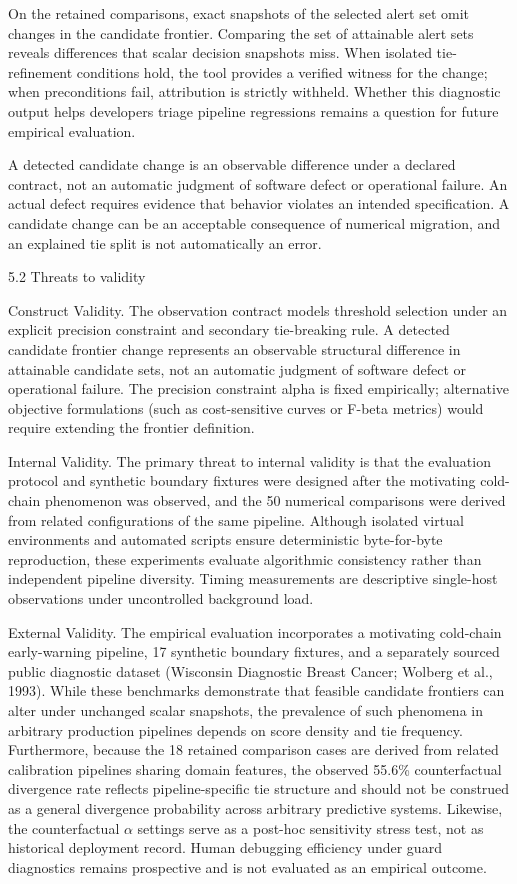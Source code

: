 \documentclass[11pt,a4paper]{article}
\begin{document}
On the retained comparisons, exact snapshots of the selected alert set omit changes in the candidate frontier. Comparing the set of attainable alert sets reveals differences that scalar decision snapshots miss. When isolated tie-refinement conditions hold, the tool provides a verified witness for the change; when preconditions fail, attribution is strictly withheld. Whether this diagnostic output helps developers triage pipeline regressions remains a question for future empirical evaluation.

A detected candidate change is an observable difference under a declared contract, not an automatic judgment of software defect or operational failure. An actual defect requires evidence that behavior violates an intended specification. A candidate change can be an acceptable consequence of numerical migration, and an explained tie split is not automatically an error.

5.2 Threats to validity

Construct Validity. The observation contract models threshold selection under an explicit precision constraint and secondary tie-breaking rule. A detected candidate frontier change represents an observable structural difference in attainable candidate sets, not an automatic judgment of software defect or operational failure. The precision constraint alpha is fixed empirically; alternative objective formulations (such as cost-sensitive curves or F-beta metrics) would require extending the frontier definition.

Internal Validity. The primary threat to internal validity is that the evaluation protocol and synthetic boundary fixtures were designed after the motivating cold-chain phenomenon was observed, and the 50 numerical comparisons were derived from related configurations of the same pipeline. Although isolated virtual environments and automated scripts ensure deterministic byte-for-byte reproduction, these experiments evaluate algorithmic consistency rather than independent pipeline diversity. Timing measurements are descriptive single-host observations under uncontrolled background load.

External Validity. The empirical evaluation incorporates a motivating cold-chain early-warning pipeline, 17 synthetic boundary fixtures, and a separately sourced public diagnostic dataset (Wisconsin Diagnostic Breast Cancer; Wolberg et al., 1993). While these benchmarks demonstrate that feasible candidate frontiers can alter under unchanged scalar snapshots, the prevalence of such phenomena in arbitrary production pipelines depends on score density and tie frequency. Furthermore, because the 18 retained comparison cases are derived from related calibration pipelines sharing domain features, the observed 55.6\% counterfactual divergence rate reflects pipeline-specific tie structure and should not be construed as a general divergence probability across arbitrary predictive systems. Likewise, the counterfactual \ensuremath{\alpha} settings serve as a post-hoc sensitivity stress test, not as historical deployment record. Human debugging efficiency under guard diagnostics remains prospective and is not evaluated as an empirical outcome.
\end{document}
